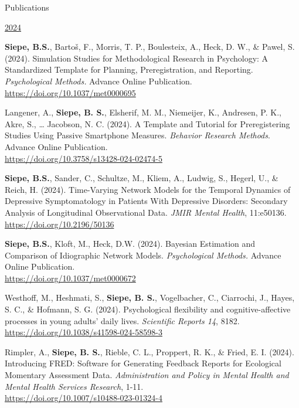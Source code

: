 \documentclass{resume} %
\begin{document}
\begin{rSection}{Publications}
\begin{etaremune}
\hspace{-0.75cm}\underline{2024}


\item \textbf{Siepe, B.S.}, Bartoš, F., Morris, T. P., Boulesteix, A., Heck, D. W., \& Pawel, S. (2024). Simulation Studies for Methodological Research in Psychology: A Standardized Template for Planning, Preregistration, and Reporting. \textit{Psychological Methods.} Advance Online Publication. \\ \url{https://doi.org/10.1037/met0000695}

\item Langener, A., \textbf{Siepe, B. S.}, Elsherif, M. M., Niemeijer, K., Andresen, P. K., Akre, S., … Jacobson, N. C. (2024). A Template and Tutorial for Preregistering Studies Using Passive Smartphone Measures. \textit{Behavior Research Methods}. Advance Online Publication. \\ 
\url{https://doi.org/10.3758/s13428-024-02474-5}

\item \textbf{Siepe, B.S.}, Sander, C., Schultze, M., Kliem, A., Ludwig, S., Hegerl, U., \& Reich, H. (2024). Time-Varying Network Models for the Temporal Dynamics of Depressive Symptomatology in Patients With Depressive Disorders: Secondary Analysis of Longitudinal Observational Data. \textit{JMIR Mental Health}, 11:e50136. \\ \url{https://doi.org/10.2196/50136}

\item \textbf{Siepe, B.S.}, Kloft, M., Heck, D.W. (2024). Bayesian Estimation and Comparison of Idiographic Network Models. \textit{Psychological Methods.} Advance Online Publication.  \\ \url{https://doi.org/10.1037/met0000672}

\item Westhoff, M., Heshmati, S., \textbf{Siepe, B. S.}, Vogelbacher, C., Ciarrochi, J., Hayes, S. C., \& Hofmann, S. G. (2024). Psychological flexibility and cognitive-affective processes in young adults’ daily lives. \textit{Scientific Reports 14}, 8182. \\ \url{https://doi.org/10.1038/s41598-024-58598-3}


\item Rimpler, A., \textbf{Siepe, B. S.}, Rieble, C. L., Proppert, R. K., \& Fried, E. I. (2024). Introducing FRED: Software for Generating Feedback Reports for Ecological Momentary Assessment Data. \textit{Administration and Policy in Mental Health and Mental Health Services Research}, 1-11. \\ \url{https://doi.org/10.1007/s10488-023-01324-4}






\end{etaremune}
\end{rSection}
\end{document}
